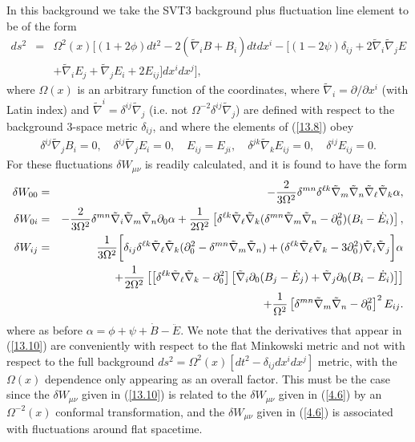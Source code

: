In this background we take the SVT3  background plus fluctuation line element to be of the form
%
\begin{eqnarray}
ds^2 &=& \Omega^2(x) \bigg[ (1+2\phi) dt^2 -2(\tilde{\nabla}_i B +B_i)dt dx^i - [(1-2\psi)\delta_{ij} +2\tilde{\nabla}_i\tilde{\nabla}_j E
\nonumber\\
&& + \tilde{\nabla}_i E_j + \tilde{\nabla}_j E_i + 2E_{ij}]dx^i dx^j\bigg],
\label{13.8}
\end{eqnarray}
%
where $\Omega(x)$ is an arbitrary function of the coordinates, where $\tilde{\nabla}_i=\partial/\partial x^i$ (with Latin index) and  $\tilde{\nabla}^i=\delta^{ij}\tilde{\nabla}_j$ (i.e. not $\Omega^{-2}\delta^{ij}\tilde{\nabla}_j$) are defined with respect to the background 3-space metric $\delta_{ij}$, and where the elements of (\ref{13.8}) obey
%
\begin{eqnarray}
\delta^{ij}\tilde{\nabla}_j B_i = 0,\quad \delta^{ij}\tilde{\nabla}_j E_i = 0, \quad E_{ij}=E_{ji},\quad \delta^{jk}\tilde{\nabla}_kE_{ij} = 0, \quad \delta^{ij}E_{ij} = 0.
\label{13.9}
\end{eqnarray}
%
For these fluctuations $\delta W_{\mu\nu}$ is readily calculated, and it is found to have the form \cite{amarasinghe_2019} 
%
\begin{eqnarray}
\delta W_{00}  &=& -\frac{2}{3\Omega^2} \delta^{mn}\delta^{\ell k}\tilde{\nabla}_m\tilde{\nabla}_n\tilde{\nabla}_{\ell}\tilde{\nabla}_k \alpha,
\nonumber\\	
\delta W_{0i} &=&  -\frac{2}{3\Omega^2} \delta^{mn}\tilde{\nabla}_i\tilde{\nabla}_m\tilde{\nabla}_n\partial_0\alpha
+\frac{1}{2\Omega^2}\left[\delta^{\ell k}\tilde{\nabla}_{\ell}\tilde{\nabla}_k(\delta^{mn}\tilde{\nabla}_m\tilde{\nabla}_n-\partial_0^2)(B_i - \dot{E}_i)\right],
\nonumber\\	
\delta W_{ij}  &=& \frac{1}{3\Omega^2}\bigg{[} \delta_{ij}\delta^{\ell k}\tilde{\nabla}_{\ell}\tilde{\nabla}_k (\partial_0^2 - \delta^{mn}\tilde{\nabla}_m\tilde{\nabla}_n) 
+(\delta^{\ell k}\tilde{\nabla}_{\ell}\tilde{\nabla}_k -3\partial_0^2)\tilde{\nabla}_i\tilde{\nabla}_j  
\bigg{] }\alpha
\nonumber\\
&&+\frac{1}{2\Omega^2}\left[ \left[\delta^{\ell k}\tilde{\nabla}_{\ell}\tilde{\nabla}_k -\partial_0^2\right]\left[\tilde{\nabla}_i   \partial_0(B_j - \dot{E}_j)+ \tilde{\nabla}_j \partial_0(B_i - \dot{E}_i)\right] \right]
\nonumber\\
&&+\frac{1}{\Omega^2}\left[\delta^{mn}\tilde{\nabla}_m\tilde{\nabla}_n-\partial_0^2\right]^2E_{ij}.
\label{13.10}
\end{eqnarray}
%
where as before $\alpha=\phi + \psi +\dot{B}-\ddot{E}$. We note that the derivatives that appear in (\ref{13.10}) are conveniently with respect to the flat Minkowski metric and not with respect to the full background $ds^2=\Omega^2(x)[dt^2-\delta_{ij}dx^idx^j]$ metric, with the $\Omega(x)$ dependence only appearing as an overall factor. This must be the case since the $\delta W_{\mu\nu}$ given in (\ref{13.10}) is related to the $\delta W_{\mu\nu}$ given in (\ref{4.6}) by an $\Omega^{-2}(x)$  conformal transformation, and the $\delta W_{\mu\nu}$ given in (\ref{4.6}) is associated with fluctuations around flat spacetime.

